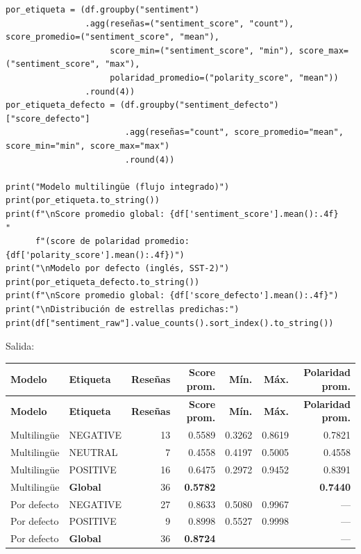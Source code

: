 \documentclass[12pt,a4paper]{article}
\begin{document}
\begin{lstlisting}[style=codigo]
por_etiqueta = (df.groupby("sentiment")
                .agg(reseñas=("sentiment_score", "count"), score_promedio=("sentiment_score", "mean"),
                     score_min=("sentiment_score", "min"), score_max=("sentiment_score", "max"),
                     polaridad_promedio=("polarity_score", "mean"))
                .round(4))
por_etiqueta_defecto = (df.groupby("sentiment_defecto")["score_defecto"]
                        .agg(reseñas="count", score_promedio="mean", score_min="min", score_max="max")
                        .round(4))

print("Modelo multilingüe (flujo integrado)")
print(por_etiqueta.to_string())
print(f"\nScore promedio global: {df['sentiment_score'].mean():.4f}   "
      f"(score de polaridad promedio: {df['polarity_score'].mean():.4f})")
print("\nModelo por defecto (inglés, SST-2)")
print(por_etiqueta_defecto.to_string())
print(f"\nScore promedio global: {df['score_defecto'].mean():.4f}")
print("\nDistribución de estrellas predichas:")
print(df["sentiment_raw"].value_counts().sort_index().to_string())
\end{lstlisting}

Salida:

{\footnotesize\renewcommand{\arraystretch}{1.3}
\begin{longtable}{|l|l|r|r|r|r|r|}
\hline
\textbf{Modelo} & \textbf{Etiqueta} & \textbf{Reseñas} & \textbf{Score prom.} & \textbf{Mín.} & \textbf{Máx.} & \textbf{Polaridad prom.} \\ \hline
\endfirsthead
\hline
\textbf{Modelo} & \textbf{Etiqueta} & \textbf{Reseñas} & \textbf{Score prom.} & \textbf{Mín.} & \textbf{Máx.} & \textbf{Polaridad prom.} \\ \hline
\endhead
Multilingüe & NEGATIVE & 13 & 0.5589 & 0.3262 & 0.8619 & 0.7821 \\ \hline
Multilingüe & NEUTRAL & 7 & 0.4558 & 0.4197 & 0.5005 & 0.4558 \\ \hline
Multilingüe & POSITIVE & 16 & 0.6475 & 0.2972 & 0.9452 & 0.8391 \\ \hline
Multilingüe & \textbf{Global} & 36 & \textbf{0.5782} &  &  & \textbf{0.7440} \\ \hline
Por defecto & NEGATIVE & 27 & 0.8633 & 0.5080 & 0.9967 & — \\ \hline
Por defecto & POSITIVE & 9 & 0.8998 & 0.5527 & 0.9998 & — \\ \hline
Por defecto & \textbf{Global} & 36 & \textbf{0.8724} &  &  & — \\ \hline
\end{longtable}}
\end{document}
